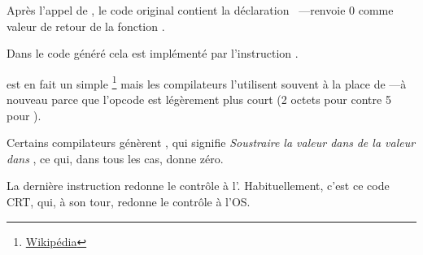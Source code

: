 
Après l'appel de \printf, le code \CCpp original contient la déclaration ~---renvoie 0 comme valeur de retour de la fonction \main.

Dans le code généré cela est implémenté par l'instruction .


\XOR est en fait un simple \footnote{\href{http://en.wikipedia.org/wiki/Exclusive_or}{Wikipédia}} mais
les compilateurs l'utilisent souvent à la place de ---à nouveau parce que l'opcode est légèrement plus
court (2 octets pour \XOR contre 5 pour \MOV).

Certains compilateurs génèrent , qui signifie \emph{Soustraire la valeur dans} \EAX \emph{de la valeur dans} \EAX,
 ce qui, dans tous les cas, donne zéro.

La dernière instruction \RET redonne le contrôle à l'.
Habituellement, c'est ce code \CCpp \ac{CRT}, qui, à son tour, redonne le contrôle à l'\ac{OS}.

